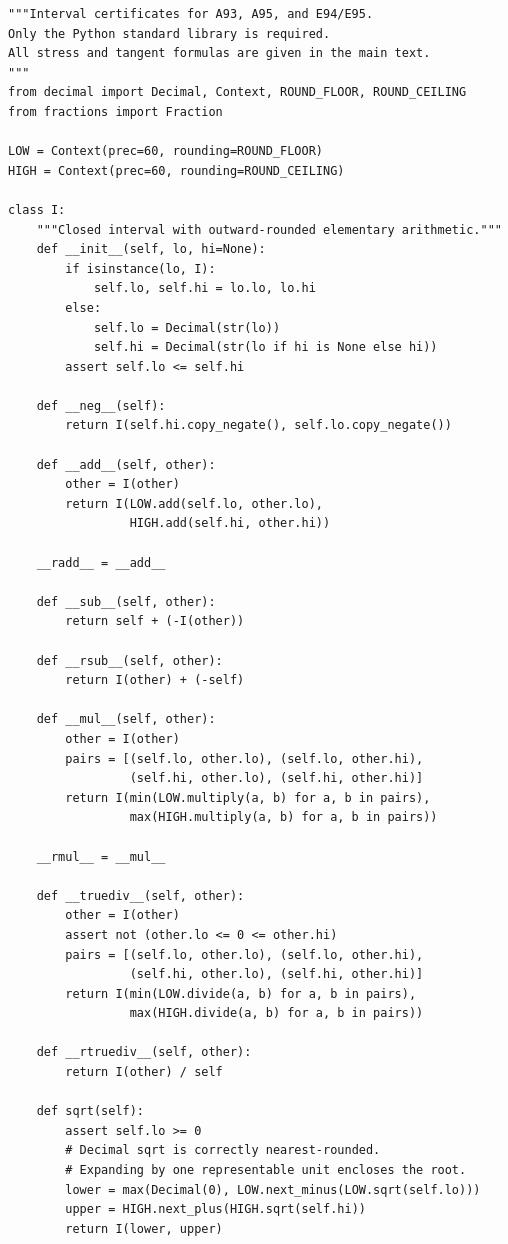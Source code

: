 \documentclass[11pt,a4paper]{article}
\numberwithin{equation}{section}
\begin{document}
\begin{lstlisting}
"""Interval certificates for A93, A95, and E94/E95.
Only the Python standard library is required.
All stress and tangent formulas are given in the main text.
"""
from decimal import Decimal, Context, ROUND_FLOOR, ROUND_CEILING
from fractions import Fraction

LOW = Context(prec=60, rounding=ROUND_FLOOR)
HIGH = Context(prec=60, rounding=ROUND_CEILING)

class I:
    """Closed interval with outward-rounded elementary arithmetic."""
    def __init__(self, lo, hi=None):
        if isinstance(lo, I):
            self.lo, self.hi = lo.lo, lo.hi
        else:
            self.lo = Decimal(str(lo))
            self.hi = Decimal(str(lo if hi is None else hi))
        assert self.lo <= self.hi

    def __neg__(self):
        return I(self.hi.copy_negate(), self.lo.copy_negate())

    def __add__(self, other):
        other = I(other)
        return I(LOW.add(self.lo, other.lo),
                 HIGH.add(self.hi, other.hi))

    __radd__ = __add__

    def __sub__(self, other):
        return self + (-I(other))

    def __rsub__(self, other):
        return I(other) + (-self)

    def __mul__(self, other):
        other = I(other)
        pairs = [(self.lo, other.lo), (self.lo, other.hi),
                 (self.hi, other.lo), (self.hi, other.hi)]
        return I(min(LOW.multiply(a, b) for a, b in pairs),
                 max(HIGH.multiply(a, b) for a, b in pairs))

    __rmul__ = __mul__

    def __truediv__(self, other):
        other = I(other)
        assert not (other.lo <= 0 <= other.hi)
        pairs = [(self.lo, other.lo), (self.lo, other.hi),
                 (self.hi, other.lo), (self.hi, other.hi)]
        return I(min(LOW.divide(a, b) for a, b in pairs),
                 max(HIGH.divide(a, b) for a, b in pairs))

    def __rtruediv__(self, other):
        return I(other) / self

    def sqrt(self):
        assert self.lo >= 0
        # Decimal sqrt is correctly nearest-rounded.
        # Expanding by one representable unit encloses the root.
        lower = max(Decimal(0), LOW.next_minus(LOW.sqrt(self.lo)))
        upper = HIGH.next_plus(HIGH.sqrt(self.hi))
        return I(lower, upper)


\end{lstlisting}
\end{document}
